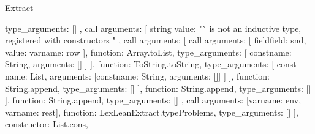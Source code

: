 \begin{lexlean}{Extract}
\begin{toolingmodule}
{{{{{{{{{{{{{{                                          type_arguments: []
                                        },
                                        call{
                                          arguments: [
                                            string{
                                              value: "` is not an inductive type, registered with constructors "
                                            },
                                            call{
                                              arguments: [
                                                call{
                                                  arguments: [
                                                    field{field: snd, value: var{name: row}}
                                                  ],
                                                  function: Array.toList,
                                                  type_arguments: [
                                                    const{name: String, arguments: []}
                                                  ]
                                                }
                                              ],
                                              function: ToString.toString,
                                              type_arguments: [
                                                const{
                                                  name: List,
                                                  arguments: [const{name: String, arguments: []}]
                                                }
                                              ]
                                            }
                                          ],
                                          function: String.append,
                                          type_arguments: []
                                        }
                                      ],
                                      function: String.append,
                                      type_arguments: []
                                    }
                                  ],
                                  function: String.append,
                                  type_arguments: []
                                },
                                call{
                                  arguments: [var{name: env}, var{name: rest}],
                                  function: LexLeanExtract.typeProblems,
                                  type_arguments: []
                                }
                              ],
                              constructor: List.cons,
}}}}}}}}}}}
\end{toolingmodule}
\end{lexlean}
